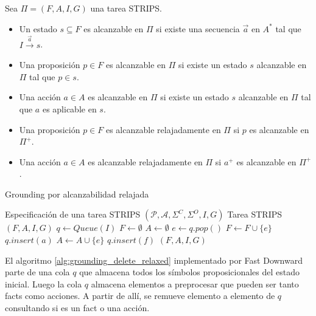 \begin{mydef}
    Sea $\Pi = (F, A, I, G)$ una tarea STRIPS.    
    \begin{itemize}
        \item Un estado $s \subseteq F$ es alcanzable en $\Pi$ si existe una
        secuencia $\vec{a}$ en $A^{*}$ tal que $I \xrightarrow{\vec{a}} s$.
    
        \item Una proposición $p \in F$ es alcanzable en $\Pi$ si existe un
        estado $s$ alcanzable en $\Pi$ tal que $p \in s$.

        \item Una acción $a \in A$ es alcanzable en $\Pi$ si existe un estado
        $s$ alcanzable en $\Pi$ tal que $a$ es aplicable en $s$.

        \item Una proposición $p \in F$ es alcanzable relajadamente en $\Pi$ si
        $p$ es alcanzable en $\Pi^{+}$.

        \item Una acción $a \in A$ es alcanzable relajadamente en $\Pi$ si
        $a^{+}$ es alcanzable en $\Pi^{+}$.
    \end{itemize}
\end{mydef}


\begin{algorithm}
    \caption{Grounding por alcanzabilidad
    relajada}\label{alg:grounding_delete_relaxed}
    \begin{algorithmic}[1]
    \Require Especificación de una tarea STRIPS $(\mathcal{P}, \mathcal{A},
    \Sigma^{C}, \Sigma^{O}, I, G)$ \Ensure Tarea STRIPS $(F, A, I, G)$ \State $q
    \gets Queue(I)$ \State $F \gets \emptyset$ \State $A \gets \emptyset$
     \State $e \gets q.pop()$  \State
    $F \gets F \cup \{e\}$  \State
    $q.insert(a)$ \EndFor \Else \State $A \gets A \cup \{e\}$  \State $q.insert(f)$ \EndFor \EndIf \EndWhile \State
    \Return $(F, A, I, G)$
    \end{algorithmic}
\end{algorithm}

El algoritmo \ref{alg:grounding_delete_relaxed} implementado por Fast Downward
parte de una cola $q$ que almacena todos los símbolos proposicionales del estado
inicial. Luego la cola $q$ almacena elementos a preprocesar que pueden ser tanto
facts como acciones. A partir de allí, se remueve elemento a elemento de $q$
consultando si es un fact o una acción.

